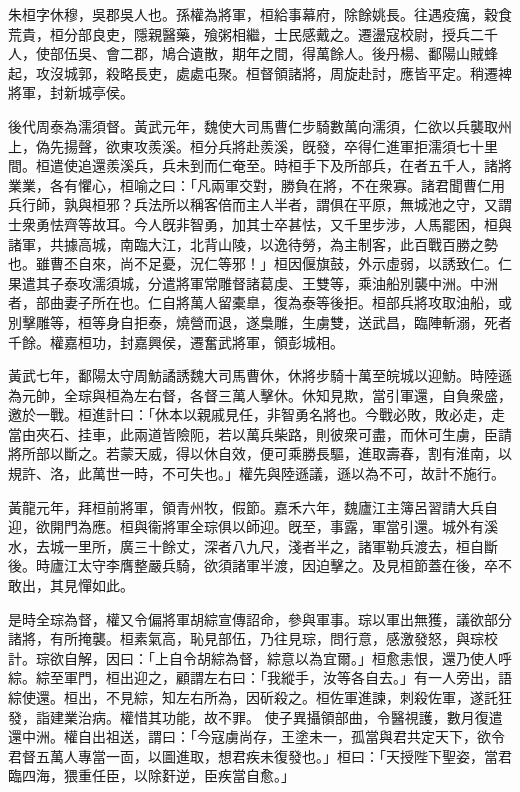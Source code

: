 \begin{pinyinscope}
 
 
 
 
 朱桓字休穆，吳郡吳人也。孫權為將軍，桓給事幕府，除餘姚長。往遇疫癘，穀食荒貴，桓分部良吏，隱親醫藥，飱粥相繼，士民感戴之。遷盪寇校尉，授兵二千人，使部伍吳、會二郡，鳩合遺散，期年之間，得萬餘人。後丹楊、鄱陽山賊蜂起，攻沒城郭，殺略長吏，處處屯聚。桓督領諸將，周旋赴討，應皆平定。稍遷裨將軍，封新城亭侯。
 
 
 
 
 後代周泰為濡須督。黃武元年，魏使大司馬曹仁步騎數萬向濡須，仁欲以兵襲取州上，偽先揚聲，欲東攻羨溪。桓分兵將赴羨溪，旣發，卒得仁進軍拒濡須七十里間。桓遣使追還羨溪兵，兵未到而仁奄至。時桓手下及所部兵，在者五千人，諸將業業，各有懼心，桓喻之曰：「凡兩軍交對，勝負在將，不在衆寡。諸君聞曹仁用兵行師，孰與桓邪？兵法所以稱客倍而主人半者，謂俱在平原，無城池之守，又謂士衆勇怯齊等故耳。今人旣非智勇，加其士卒甚怯，又千里步涉，人馬罷困，桓與諸軍，共據高城，南臨大江，北背山陵，以逸待勞，為主制客，此百戰百勝之勢也。雖曹丕自來，尚不足憂，況仁等邪！」桓因偃旗鼓，外示虛弱，以誘致仁。仁果遣其子泰攻濡須城，分遣將軍常雕督諸葛虔、王雙等，乘油船別襲中洲。中洲者，部曲妻子所在也。仁自將萬人留橐臯，復為泰等後拒。桓部兵將攻取油船，或別擊雕等，桓等身自拒泰，燒營而退，遂梟雕，生虜雙，送武昌，臨陣斬溺，死者千餘。權嘉桓功，封嘉興侯，遷奮武將軍，領彭城相。
 
 
 
 
 黃武七年，鄱陽太守周魴譎誘魏大司馬曹休，休將步騎十萬至皖城以迎魴。時陸遜為元帥，全琮與桓為左右督，各督三萬人擊休。休知見欺，當引軍還，自負衆盛，邀於一戰。桓進計曰：「休本以親戚見任，非智勇名將也。今戰必敗，敗必走，走當由夾石、挂車，此兩道皆險阨，若以萬兵柴路，則彼衆可盡，而休可生虜，臣請將所部以斷之。若蒙天威，得以休自效，便可乘勝長驅，進取壽春，割有淮南，以規許、洛，此萬世一時，不可失也。」權先與陸遜議，遜以為不可，故計不施行。
 
 
 
 
 黃龍元年，拜桓前將軍，領青州牧，假節。嘉禾六年，魏廬江主簿呂習請大兵自迎，欲開門為應。桓與衞將軍全琮俱以師迎。旣至，事露，軍當引還。城外有溪水，去城一里所，廣三十餘丈，深者八九尺，淺者半之，諸軍勒兵渡去，桓自斷後。時廬江太守李膺整嚴兵騎，欲須諸軍半渡，因迫擊之。及見桓節蓋在後，卒不敢出，其見憚如此。
 
 
是時全琮為督，權又令偏將軍胡綜宣傳詔命，參與軍事。琮以軍出無獲，議欲部分諸將，有所掩襲。桓素氣高，恥見部伍，乃往見琮，問行意，感激發怒，與琮校計。琮欲自解，因曰：「上自令胡綜為督，綜意以為宜爾。」桓愈恚恨，還乃使人呼綜。綜至軍門，桓出迎之，顧謂左右曰：「我縱手，汝等各自去。」有一人旁出，語綜使還。桓出，不見綜，知左右所為，因斫殺之。桓佐軍進諫，刺殺佐軍，遂託狂發，詣建業治病。權惜其功能，故不罪。
 使子異攝領部曲，令醫視護，數月復遣還中洲。權自出祖送，謂曰：「今寇虜尚存，王塗未一，孤當與君共定天下，欲令君督五萬人專當一靣，以圖進取，想君疾未復發也。」桓曰：「天授陛下聖姿，當君臨四海，猥重任臣，以除姧逆，臣疾當自愈。」
 

\end{pinyinscope}
